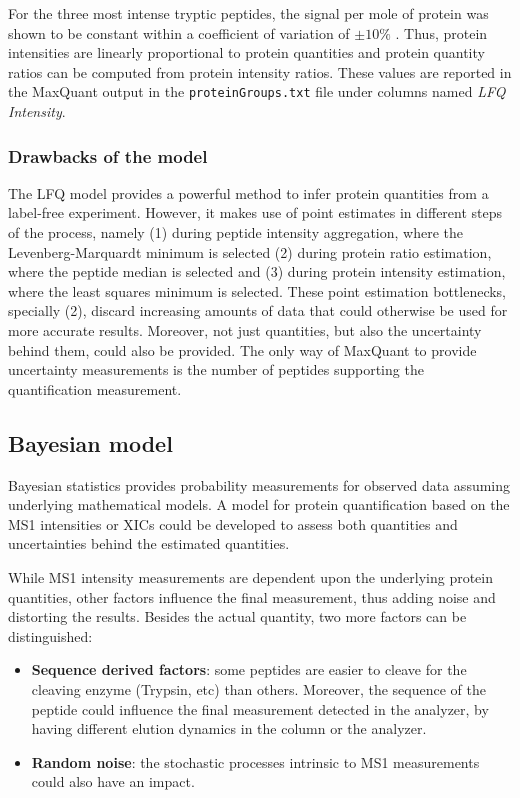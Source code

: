 \documentclass[11pt, a4paper]{report}
\begin{document}
For the three most intense tryptic peptides, the signal per mole of protein was shown to be constant within a coefficient of variation of $\pm 10 \%$ \cite{Mikalsen2007}. Thus, protein intensities are linearly proportional to protein quantities and protein quantity ratios can be computed from protein intensity ratios. These values are reported in the MaxQuant output in the \texttt{proteinGroups.txt} file under columns named \textit{LFQ Intensity}.
		
\subsubsection{Drawbacks of the model}

The LFQ model provides a powerful method to infer protein quantities from a label-free experiment. However, it makes use of point estimates in different steps of the process, namely (1) during peptide intensity aggregation, where the Levenberg-Marquardt minimum is selected (2) during protein ratio estimation, where the peptide median is selected and (3) during protein intensity estimation, where the least squares minimum is selected. These point estimation bottlenecks, specially (2), discard increasing amounts of data that could otherwise be used for more accurate results. Moreover, not just quantities, but also the uncertainty behind them, could also be provided. The only way of MaxQuant to provide uncertainty measurements is the number of peptides supporting the quantification measurement.


\subsection{Bayesian model}

Bayesian statistics provides probability measurements for observed data assuming underlying mathematical models. A model for protein quantification based on the \ac{MS1} intensities or XICs could be developed to assess both quantities and uncertainties behind the estimated quantities.

While \ac{MS1} intensity measurements are dependent upon the underlying protein quantities, other factors influence the final measurement, thus adding noise and distorting the results. Besides the actual quantity, two more factors can be distinguished:

\begin{itemize}

\item \textbf{Sequence derived factors}: some peptides are easier to cleave for the cleaving enzyme (Trypsin, etc) than others. Moreover, the sequence of the peptide could influence the final measurement detected in the analyzer, by having different elution dynamics in the column or the analyzer.

\item \textbf{Random noise}: the stochastic processes intrinsic to \ac{MS1} measurements could also have an impact.

\end{itemize}
\end{document}
